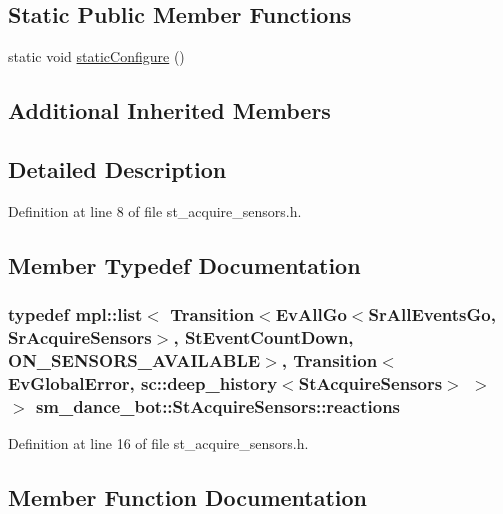 \subsection*{Static Public Member Functions}
\begin{DoxyCompactItemize}
\item 
static void \hyperlink{structsm__dance__bot_1_1StAcquireSensors_a4b0a4fcd72ddfee7f81b3be252c8597f}{static\+Configure} ()
\end{DoxyCompactItemize}
\subsection*{Additional Inherited Members}


\subsection{Detailed Description}


Definition at line 8 of file st\+\_\+acquire\+\_\+sensors.\+h.



\subsection{Member Typedef Documentation}
\subsubsection[{\texorpdfstring{reactions}{reactions}}]{\setlength{\rightskip}{0pt plus 5cm}typedef mpl\+::list$<$ Transition$<$Ev\+All\+Go$<$Sr\+All\+Events\+Go, Sr\+Acquire\+Sensors$>$, {\bf St\+Event\+Count\+Down}, {\bf O\+N\+\_\+\+S\+E\+N\+S\+O\+R\+S\+\_\+\+A\+V\+A\+I\+L\+A\+B\+LE}$>$, Transition$<${\bf Ev\+Global\+Error}, sc\+::deep\+\_\+history$<${\bf St\+Acquire\+Sensors}$>$ $>$ $>$ {\bf sm\+\_\+dance\+\_\+bot\+::\+St\+Acquire\+Sensors\+::reactions}}\hypertarget{structsm__dance__bot_1_1StAcquireSensors_a575dd244650f9a08c2a30f06f570d5a3}{}\label{structsm__dance__bot_1_1StAcquireSensors_a575dd244650f9a08c2a30f06f570d5a3}


Definition at line 16 of file st\+\_\+acquire\+\_\+sensors.\+h.



\subsection{Member Function Documentation}
